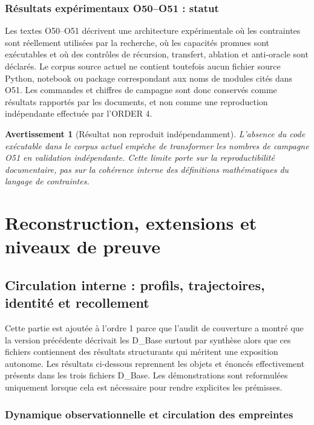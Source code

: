 \documentclass[11pt,a4paper,openany]{book}
\newtheorem{warning}[definition]{Avertissement}
\begin{document}
\section{Résultats expérimentaux O50--O51 : statut}
Les textes O50--O51 décrivent une architecture expérimentale où les contraintes sont réellement utilisées par la recherche, où les capacités promues sont exécutables et où des contrôles de récursion, transfert, ablation et anti-oracle sont déclarés. Le corpus source actuel ne contient toutefois aucun fichier source Python, notebook ou package correspondant aux noms de modules cités dans O51. Les commandes et chiffres de campagne sont donc conservés comme résultats rapportés par les documents, et non comme une reproduction indépendante effectuée par l'ORDER 4.

\begin{warning}[Résultat non reproduit indépendamment]
L'absence du code exécutable dans le corpus actuel empêche de transformer les nombres de campagne O51 en validation indépendante. Cette limite porte sur la reproductibilité documentaire, pas sur la cohérence interne des définitions mathématiques du langage de contraintes.
\end{warning}


\part{Reconstruction, extensions et niveaux de preuve}

\chapter{Circulation interne : profils, trajectoires, identité et recollement}
\label{chap:restauration-dbase}

Cette partie est ajoutée à l'ordre 1 parce que l'audit de couverture a montré que la version précédente décrivait les D\_Base surtout par synthèse alors que ces fichiers contiennent des résultats structurants qui méritent une exposition autonome. Les résultats ci-dessous reprennent les objets et énoncés effectivement présents dans les trois fichiers D\_Base. Les démonstrations sont reformulées uniquement lorsque cela est nécessaire pour rendre explicites les prémisses.

\section{Dynamique observationnelle et circulation des empreintes}
\end{document}
